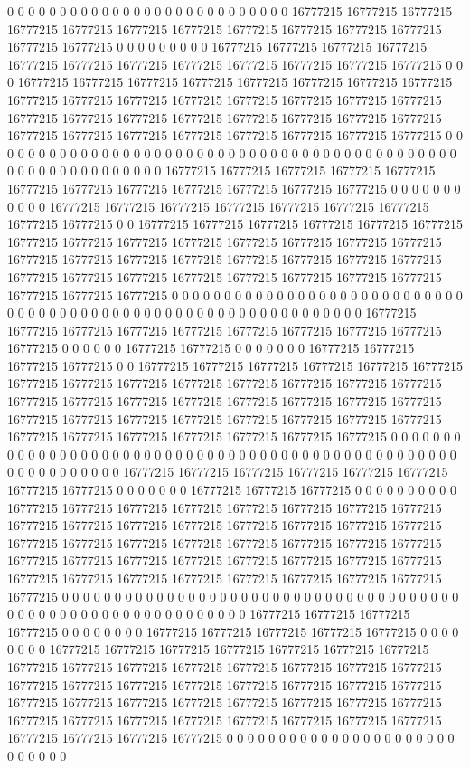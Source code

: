 0 0 0 0 0 0 0 0 0 0 0 0 0 0 0 0 0 0 0 0 0 0 0 0 0 0 0 16777215 16777215 16777215 16777215 16777215 16777215 16777215 16777215 16777215 16777215 16777215 16777215 16777215 0 0 0 0 0 0 0 0 0 16777215 16777215 16777215 16777215 16777215 16777215 16777215 16777215 16777215 16777215 16777215 16777215 0 0 0 16777215 16777215 16777215 16777215 16777215 16777215 16777215 16777215 16777215 16777215 16777215 16777215 16777215 16777215 16777215 16777215 16777215 16777215 16777215 16777215 16777215 16777215 16777215 16777215 16777215 16777215 16777215 16777215 16777215 16777215 16777215 16777215 0 0 0 0 0 0 0 0 0 0 0 0 0 0 0 0 0 0 0 0 0 0 0 0 0 0 0 0 0 0 0 0
0 0 0 0 0 0 0 0 0 0 0 0 0 0 0 0 0 0 0 0 0 0 0 0 0 0 0 0 16777215 16777215 16777215 16777215 16777215 16777215 16777215 16777215 16777215 16777215 16777215 16777215 0 0 0 0 0 0 0 0 0 0 0 16777215 16777215 16777215 16777215 16777215 16777215 16777215 16777215 16777215 0 0 16777215 16777215 16777215 16777215 16777215 16777215 16777215 16777215 16777215 16777215 16777215 16777215 16777215 16777215 16777215 16777215 16777215 16777215 16777215 16777215 16777215 16777215 16777215 16777215 16777215 16777215 16777215 16777215 16777215 16777215 16777215 16777215 16777215 0 0 0 0 0 0 0 0 0 0 0 0 0 0 0 0 0 0 0 0 0 0 0 0 0 0 0 0 0 0 0 0 0
0 0 0 0 0 0 0 0 0 0 0 0 0 0 0 0 0 0 0 0 0 0 0 0 0 0 0 0 0 16777215 16777215 16777215 16777215 16777215 16777215 16777215 16777215 16777215 16777215 0 0 0 0 0 0 16777215 16777215 0 0 0 0 0 0 0 16777215 16777215 16777215 16777215 0 0 16777215 16777215 16777215 16777215 16777215 16777215 16777215 16777215 16777215 16777215 16777215 16777215 16777215 16777215 16777215 16777215 16777215 16777215 16777215 16777215 16777215 16777215 16777215 16777215 16777215 16777215 16777215 16777215 16777215 16777215 16777215 16777215 16777215 16777215 16777215 16777215 16777215 0 0 0 0 0 0 0 0 0 0 0 0 0 0 0 0 0 0 0 0 0 0 0 0 0 0 0 0 0 0 0
0 0 0 0 0 0 0 0 0 0 0 0 0 0 0 0 0 0 0 0 0 0 0 0 0 0 0 0 0 0 16777215 16777215 16777215 16777215 16777215 16777215 16777215 16777215 0 0 0 0 0 0 0 16777215 16777215 16777215 0 0 0 0 0 0 0 0 0 0 16777215 16777215 16777215 16777215 16777215 16777215 16777215 16777215 16777215 16777215 16777215 16777215 16777215 16777215 16777215 16777215 16777215 16777215 16777215 16777215 16777215 16777215 16777215 16777215 16777215 16777215 16777215 16777215 16777215 16777215 16777215 16777215 16777215 16777215 16777215 16777215 16777215 16777215 16777215 16777215 16777215 0 0 0 0 0 0 0 0 0 0 0 0 0 0 0 0 0 0 0 0 0 0 0 0 0 0 0 0 0
0 0 0 0 0 0 0 0 0 0 0 0 0 0 0 0 0 0 0 0 0 0 0 0 0 0 0 0 0 0 0 0 16777215 16777215 16777215 16777215 0 0 0 0 0 0 0 0 16777215 16777215 16777215 16777215 16777215 0 0 0 0 0 0 0 0 16777215 16777215 16777215 16777215 16777215 16777215 16777215 16777215 16777215 16777215 16777215 16777215 16777215 16777215 16777215 16777215 16777215 16777215 16777215 16777215 16777215 16777215 16777215 16777215 16777215 16777215 16777215 16777215 16777215 16777215 16777215 16777215 16777215 16777215 16777215 16777215 16777215 16777215 16777215 16777215 16777215 16777215 16777215 0 0 0 0 0 0 0 0 0 0 0 0 0 0 0 0 0 0 0 0 0 0 0 0 0 0 0 0
